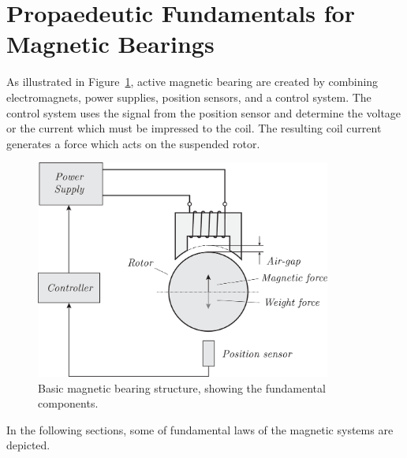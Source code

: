 \documentclass[11pt,a4paper,oneside]{book}
\numberwithin{equation}{section}
\theoremstyle{it}
\theoremstyle{definition}
\begin{document}
\section{Propaedeutic Fundamentals for Magnetic Bearings}	
As illustrated in Figure~\ref{magnetic_bearing_1}, active magnetic bearing are created by combining electromagnets, power supplies, position sensors, and a control system. The control system uses the signal from the position sensor and determine the voltage or the current which must be impressed to the coil. The resulting coil current generates a force which acts on the suspended rotor.
\begin{figure}[H]
	\centering
	\includegraphics[width = 275pt, angle = 0, 
	keepaspectratio]{figures/magnetic_bearing/magnetic_bearing_2.eps}
	\captionsetup{width=0.5\textwidth, font=small}	
	\caption{Basic magnetic bearing structure, showing the fundamental components.}
	\label{magnetic_bearing_1}
\end{figure}
In the following sections, some of fundamental laws of the magnetic systems are depicted.
\end{document}
